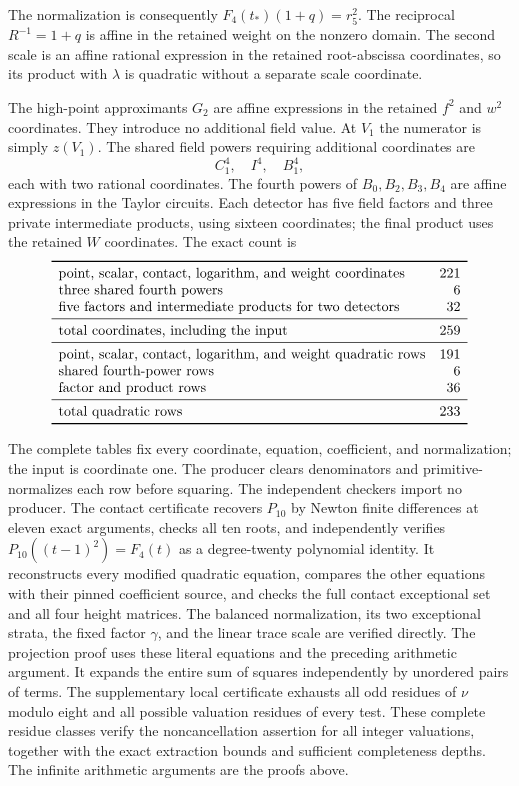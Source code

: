 \documentclass[11pt,a4paper]{article}
\begin{document}
The normalization is consequently $F_4(t_*)(1+q)=r_5^2$. The reciprocal $R^{-1}=1+q$ is affine in the retained weight on the nonzero domain. The second scale is an affine rational expression in the retained
root-abscissa coordinates, so its product with $\lambda$ is quadratic
without a separate scale coordinate.

The high-point approximants $G_2$ are affine expressions in the
retained $f^2$ and $w^2$ coordinates. They introduce no additional
field value. At $V_1$ the numerator is simply $z(V_1)$.
The shared field powers requiring additional coordinates are
\[
                              C_1^4,\quad I^4,\quad B_1^4,
\]
each with two rational coordinates. The fourth powers of
$B_0,B_2,B_3,B_4$ are affine expressions in the Taylor circuits.
Each detector has five field factors and three private intermediate
products, using sixteen coordinates; the final product uses the
retained $W$ coordinates. The exact count is
\[
\begin{array}{lr}\toprule
\text{point, scalar, contact, logarithm, and weight coordinates}&221\\
\text{three shared fourth powers}&6\\
\text{five factors and intermediate products for two detectors}&32\\\midrule
\text{total coordinates, including the input}&259\\\midrule
\text{point, scalar, contact, logarithm, and weight quadratic rows}&191\\
\text{shared fourth-power rows}&6\\
\text{factor and product rows}&36\\\midrule
\text{total quadratic rows}&233\\\bottomrule
\end{array}
\]

The complete tables fix every coordinate, equation, coefficient, and
normalization; the input is coordinate one. The producer clears
denominators and primitive-normalizes each row before squaring.
The independent checkers import no producer. The contact certificate recovers $P_{10}$ by
Newton finite differences at eleven exact arguments, checks all ten roots,
and independently verifies $P_{10}((t-1)^2)=F_4(t)$ as a degree-twenty
polynomial identity. It reconstructs every modified quadratic equation,
compares the other equations with their pinned coefficient source, and
checks the full contact exceptional set and all four height matrices.
The balanced normalization, its two exceptional strata, the fixed factor $\gamma$, and the linear trace scale are verified directly.
The projection proof uses these literal equations and the preceding
arithmetic argument.
It expands the entire sum of squares independently by unordered
pairs of terms. The supplementary local certificate exhausts all
odd residues of $\nu$ modulo eight and all possible valuation residues
of every test. These complete residue classes verify the
noncancellation assertion for all integer valuations, together with
the exact extraction bounds and sufficient completeness depths.
The infinite arithmetic arguments are the proofs above.
\end{document}
